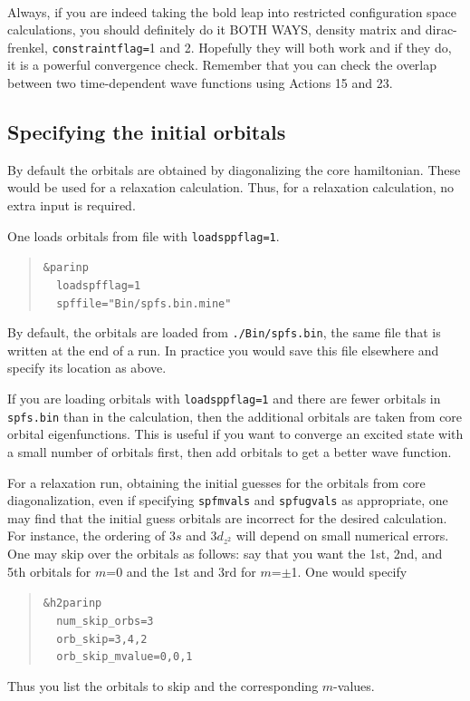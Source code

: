 \documentclass[10pt,leqno, oneside]{book}
\begin{document}
\

Always, if you are indeed taking the bold leap into restricted configuration space calculations, you should definitely do it BOTH WAYS,
density matrix and dirac-frenkel, \verb#constraintflag=#1 and 2.
Hopefully they will both work and if they do, it is a powerful convergence check.  Remember that 
you can check the overlap between two time-dependent wave functions
using Actions 15 and 23.



\subsection{Specifying the initial orbitals}



By default the orbitals are obtained by diagonalizing the core hamiltonian.  These would be used for a relaxation calculation.  Thus, for a relaxation calculation, no extra input is required.

One loads orbitals from file with \verb#loadsppflag=1#.   
\begin{quote}
{\footnotesize 
\verb#&parinp# \\
\verb#  loadspfflag=1#\\
\verb#  spffile="Bin/spfs.bin.mine"#}
\end{quote}

By default, the orbitals are loaded from \verb#./Bin/spfs.bin#, the same file that is written at the end of a run.  In practice you would save this file elsewhere and specify its location as above.

If you are loading orbitals with \verb#loadsppflag=1# and there are fewer orbitals in \verb#spfs.bin# than in the calculation, then the additional orbitals are taken from core orbital eigenfunctions.  This is useful if you want to converge an excited state with a small number of orbitals first, then add orbitals to get a better wave function.

For a relaxation run, obtaining the initial guesses for the orbitals from core diagonalization, even if specifying \verb#spfmvals# and \verb#spfugvals# as appropriate, one may find that the initial guess orbitals are incorrect for the desired calculation.  For instance, the ordering of 3$s$ and 3$d_{z^2}$ will depend on small numerical errors.  One may skip over the orbitals as follows: say that you want the 1st, 2nd, and 5th orbitals for $m$=0 and the 1st and 3rd for $m$=$\pm$1.  One would specify
\begin{quote}
{\footnotesize 
\verb#&h2parinp# \\
\verb#  num_skip_orbs=3# \\
\verb#  orb_skip=3,4,2#\\
\verb#  orb_skip_mvalue=0,0,1#}
\end{quote}
Thus you list the orbitals to skip and the corresponding $m$-values.
\end{document}
